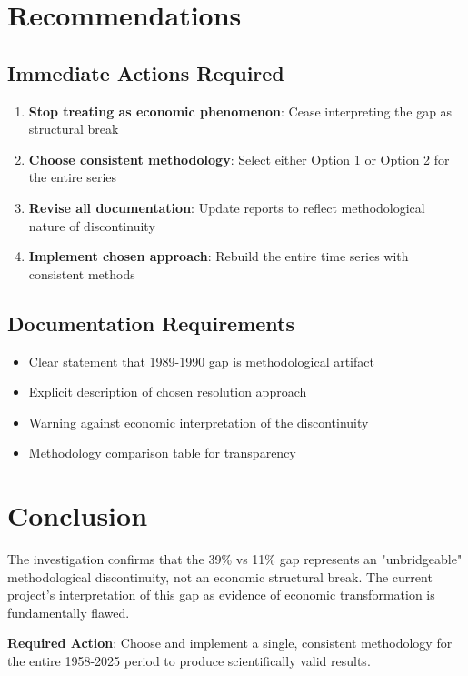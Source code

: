\documentclass[12pt]{article}
\begin{document}
\section{Recommendations}

\subsection{Immediate Actions Required}

\begin{enumerate}
    \item \textbf{Stop treating as economic phenomenon}: Cease interpreting the gap as structural break
    \item \textbf{Choose consistent methodology}: Select either Option 1 or Option 2 for the entire series
    \item \textbf{Revise all documentation}: Update reports to reflect methodological nature of discontinuity
    \item \textbf{Implement chosen approach}: Rebuild the entire time series with consistent methods
\end{enumerate}

\subsection{Documentation Requirements}

\begin{itemize}
    \item Clear statement that 1989-1990 gap is methodological artifact
    \item Explicit description of chosen resolution approach
    \item Warning against economic interpretation of the discontinuity
    \item Methodology comparison table for transparency
\end{itemize}

\section{Conclusion}

\begin{tcolorbox}[colback=blue!5!white,colframe=blue!75!black,title=Final Assessment]
The investigation confirms that the 39\% vs 11\% gap represents an "unbridgeable" methodological discontinuity, not an economic structural break. The current project's interpretation of this gap as evidence of economic transformation is fundamentally flawed.

\textbf{Required Action}: Choose and implement a single, consistent methodology for the entire 1958-2025 period to produce scientifically valid results.
\end{tcolorbox}
\end{document}
